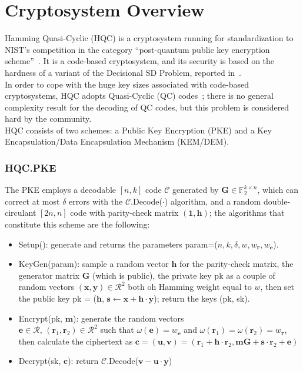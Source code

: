 \section{Cryptosystem Overview}
 Hamming Quasi-Cyclic (HQC) is a cryptosystem running for standardization to NIST's competition in the category ``post-quantum public key encryption scheme''~\cite{melchor2018hamming}.
It is a code-based cryptosystem, and its security is based on the hardness of a variant of the Decisional SD Problem, reported in~\cite{aguilar2018efficient}.\\
In order to cope with the huge key sizes associated with code-based cryptosystems, HQC adopts Quasi-Cyclic (QC) codes~\cite{gaborit2005shorter}; there is no general complexity result for the decoding of QC codes, but this problem is considered hard by the community.\\

HQC consists of two schemes: a Public Key Encryption (PKE) and a Key Encapsulation/Data Encapsulation Mechanism (KEM/DEM).

\subsubsection*{\textbf{\textsf{HQC.PKE}}}
The PKE employs a decodable $[n, k]$ code $\mathcal{C}$ generated by $\mathbf{G}\in \mathds{F}_2^{k\times n}$, which can correct at most $\delta$ errors with the $\mathcal{C}$.\textsf{Decode}($\cdot$) algorithm, and a random double-circulant $[2n, n]$ code with parity-check matrix $(\mathbf{1}, \mathbf{h})$; the algorithms that constitute this scheme are the following:

\begin{itemize}
  \item \textsf{Setup}(): generate and returns the parameters \textsf{param}=($n, k, \delta, w, w_{\mathbf{r}}, w_{\mathbf{e}}$).
  \item \textsf{KeyGen}(\textsf{param}): sample a random vector $\mathbf{h}$ for the parity-check matrix, the generator matrix $\mathbf{G}$ (which is public), the private key \textsf{pk} as a couple of random vectors $(\mathbf{x}, \mathbf{y}) \in \mathcal{R}^2$ both oh Hamming weight equal to $w$, then set the public key \textsf{pk} = ($\mathbf{h}$, $\mathbf{s} \leftarrow \mathbf{x}+\mathbf{h\cdot y}$); return the keys (\textsf{pk}, \textsf{sk}).
  \item \textsf{Encrypt}(\textsf{pk}, $\mathbf{m}$): generate the random vectors\\ $\mathbf{e} \in \mathcal{R}$, $(\mathbf{r}_1, \mathbf{r}_2) \in \mathcal{R}^2$ such that $\omega(\mathbf{e}) = w_{\mathbf{e}}$ and $\omega(\mathbf{r}_1) = \omega(\mathbf{r}_2) = w_{\mathbf{r}}$, then calculate the ciphertext as $\mathbf{c} = (\mathbf{u}, \mathbf{v}) = (\mathbf{r}_1 + \mathbf{h}\cdot\mathbf{r}_2, \mathbf{mG} + \mathbf{s}\cdot\mathbf{r}_2 + \mathbf{e})$
  \item \textsf{Decrypt}(\textsf{sk}, $\mathbf{c}$): return $\mathcal{C}$.\textsf{Decode}($\mathbf{v} - \mathbf{u\cdot y}$)
\end{itemize}
 
